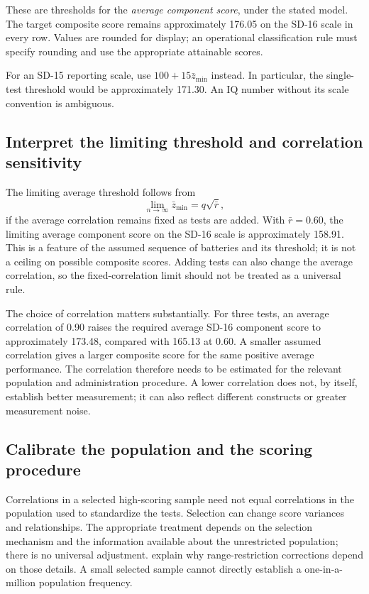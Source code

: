 \documentclass[
  a4paper,fontsize=11pt,parskip=half,headings=small,
  numbers=noenddot,bibliography=totoc
]{scrartcl}
\begin{document}
These are thresholds for the \emph{average component score}, under the
stated model. The target composite score remains approximately 176.05 on
the SD-16 scale in every row. Values are rounded for display; an operational
classification rule must specify rounding and use the appropriate
attainable scores.

For an SD-15 reporting scale, use \(100+15\bar z_{\min}\) instead. In
particular, the single-test threshold would be approximately 171.30. An IQ
number without its scale convention is ambiguous.

\subsection{Interpret the limiting threshold and correlation sensitivity}

The limiting average threshold follows from
\begin{equation}
  \lim_{n\to\infty}\bar z_{\min}=q\sqrt{\bar r},
  \label{eq:limit}
\end{equation}
if the average correlation remains fixed as tests are added. With
\(\bar r=0.60\), the limiting average component score on the SD-16 scale is
approximately 158.91. This is a feature of the assumed sequence of batteries
and its threshold; it is not a ceiling on possible composite scores. Adding
tests can also change the average correlation, so the fixed-correlation
limit should not be treated as a universal rule.

The choice of correlation matters substantially. For three tests, an
average correlation of 0.90 raises the required average SD-16 component
score to approximately 173.48, compared with 165.13 at 0.60. A smaller
assumed correlation gives a larger composite score for the same positive
average performance. The correlation therefore needs to be estimated for
the relevant population and administration procedure. A lower correlation
does not, by itself, establish better measurement; it can also reflect
different constructs or greater measurement noise.

\subsection{Calibrate the population and the scoring procedure}

Correlations in a selected high-scoring sample need not equal correlations
in the population used to standardize the tests. Selection can change score
variances and relationships. The appropriate treatment depends on the
selection mechanism and the information available about the unrestricted
population; there is no universal adjustment. \citet{sackett2000} explain
why range-restriction corrections depend on those details. A small selected
sample cannot directly establish a one-in-a-million population frequency.
\end{document}
